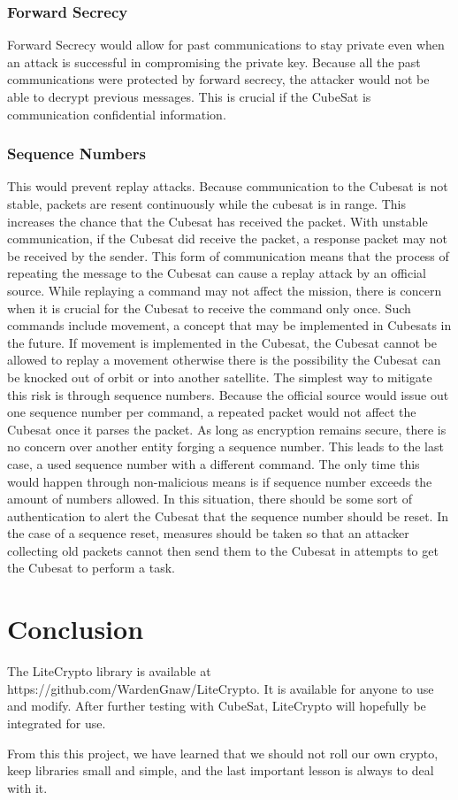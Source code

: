 \documentclass[12pt]{article}
\begin{document}
\begin{multicols}{2}
\subsubsection{Forward Secrecy}
Forward Secrecy would allow for past communications to stay private even when an attack is successful in compromising the private key. Because all the past communications were protected by forward secrecy, the attacker would not be able to decrypt previous messages. This is crucial if the CubeSat is communication confidential information.
\subsubsection{Sequence Numbers}
This would prevent replay attacks. Because communication to the Cubesat is not stable, packets are resent continuously while the cubesat is in range. This increases the chance that the Cubesat has received the packet. With unstable communication, if the Cubesat did receive the packet, a response packet may not be received by the sender. This form of communication means that the process of repeating the message to the Cubesat can cause a replay attack by an official source. While replaying a command may not affect the mission, there is concern when it is crucial for the Cubesat to receive the command only once. Such commands include movement, a concept that may be implemented in Cubesats in the future. If movement is implemented in the Cubesat, the Cubesat cannot be allowed to replay a movement otherwise there is the possibility the Cubesat can be knocked out of orbit or into another satellite. The simplest way to mitigate this risk is through sequence numbers. Because the official source would issue out one sequence number per command, a repeated packet would not affect the Cubesat once it parses the packet. As long as encryption remains secure, there is no concern over another entity forging a sequence number. This leads to the last case, a used sequence number with a different command. The only time this would happen through non-malicious means is if sequence number exceeds the amount of numbers allowed. In this situation, there should be some sort of authentication to alert the Cubesat that the sequence number should be reset. In the case of a sequence reset, measures should be taken so that an attacker collecting old packets cannot then send them to the Cubesat in attempts to get the Cubesat to perform a task.
\section{Conclusion}
The LiteCrypto library is available at https://github.com/WardenGnaw/LiteCrypto. It is available for anyone to use and modify. After further testing with CubeSat, LiteCrypto will hopefully be integrated for use.

From this this project, we have learned that we should not roll our own crypto,  keep libraries small and simple, and the last important lesson is always to deal with it.
\end{multicols}
\clearpage
\nocite{*}
\def\UrlBreaks{\do\/\do-}




\end{document}
